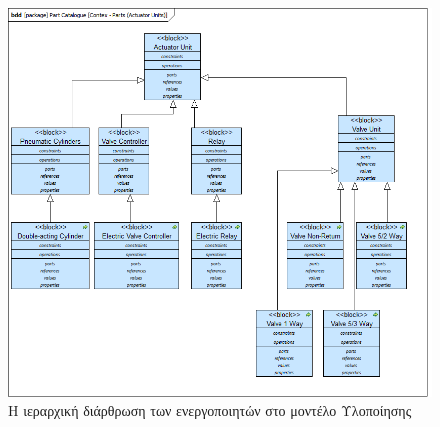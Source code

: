 \documentclass[a4paper,12pt,twoside]{report}
\begin{document}
{\begin{appendices}
				\begin{figure}[hp]
					\centering
					\includegraphics[scale=0.50]{DesignModel_Contex-Parts(ActuatorUnits).png}
					\caption{Η ιεραρχική διάρθρωση των ενεργοποιητών στο μοντέλο Υλοποίησης}
					\label{φωτ:Η ιεραρχική διάρθρωση των ενεργοποιητών στο μοντέλο Υλοποίησης}
				\end{figure}
				

\end{appendices}}
\end{document}

